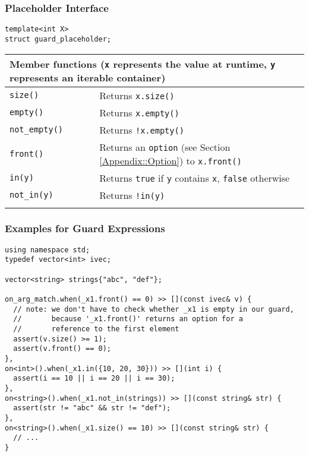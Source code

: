 \subsubsection{Placeholder Interface}

\begin{lstlisting}
template<int X>
struct guard_placeholder;
\end{lstlisting}

\begin{tabular*}{\textwidth}{m{0.3\linewidth}m{0.7\linewidth}}
  \multicolumn{2}{m{\linewidth}}{\large{\textbf{Member functions} \small{(\lstinline^x^ represents the value at runtime, \lstinline^y^ represents an iterable container)}}\vspace{3pt}} \\
  \hline
  \lstinline^size()^ & Returns \lstinline^x.size()^ \\
  \hline
  \lstinline^empty()^ & Returns \lstinline^x.empty()^ \\
  \hline
  \lstinline^not_empty()^ & Returns \lstinline^!x.empty()^ \\
  \hline
  \lstinline^front()^ & Returns an \lstinline^option^ (see Section \ref{Appendix::Option}) to \lstinline^x.front()^  \\
  \hline
  \lstinline^in(y)^ & Returns \lstinline^true^ if \lstinline^y^ contains \lstinline^x^, \lstinline^false^ otherwise\\
  \hline
  \lstinline^not_in(y)^ & Returns \lstinline^!in(y)^  \\
  \hline
  \\
\end{tabular*}

\subsubsection{Examples for Guard Expressions}

\begin{lstlisting}
using namespace std;
typedef vector<int> ivec;

vector<string> strings{"abc", "def"};

on_arg_match.when(_x1.front() == 0) >> [](const ivec& v) {
  // note: we don't have to check whether _x1 is empty in our guard,
  //       because '_x1.front()' returns an option for a 
  //       reference to the first element
  assert(v.size() >= 1);
  assert(v.front() == 0);
},
on<int>().when(_x1.in({10, 20, 30})) >> [](int i) {
  assert(i == 10 || i == 20 || i == 30);
},
on<string>().when(_x1.not_in(strings)) >> [](const string& str) {
  assert(str != "abc" && str != "def");
},
on<string>().when(_x1.size() == 10) >> [](const string& str) {
  // ...
}
\end{lstlisting}

